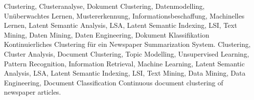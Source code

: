\HAWAbstractPage
  {Clustering, Clusteranalyse, Dokument Clustering, Datenmodelling, Unüberwachtes Lernen, Mustererkennung, Informationsbeschaffung, Machinelles Lernen, Latent Semantic Analysis, LSA, Latent Semantic Indexing, LSI, Text Mining, Daten Mining, Daten Engineering, Dokument Klassifikation}
  {Kontinuierliches Clustering für ein Newspaper Summarization System.}
  {Clustering, Cluster Analysis, Document Clustering, Topic Modelling, Unsupervised Learning, Pattern Recognition, Information Retrieval, Machine Learning, Latent Semantic Analysis, LSA, Latent Semantic Indexing, LSI, Text Mining, Data Mining, Data Engineering, Document Classification}
  {Continuous document clustering of newspaper articles.}